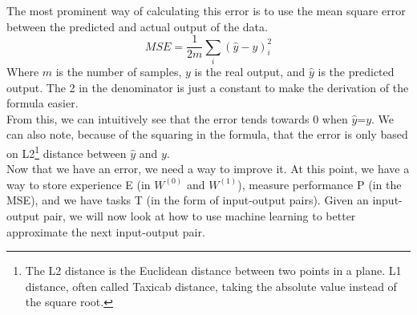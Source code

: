 \noindent The most prominent way of calculating this error is to use the mean square error between the predicted and actual output of the data. 
\begin{equation}\label{eq:MSE_form}
     MSE=\frac{1}{2m} \sum_i (\hat{y}-y)_i^2
\end{equation}
Where $m$ is the number of samples, $y$ is the real output, and $\hat{y}$ is the predicted output. The 2 in the denominator is just a constant to make the derivation of the formula easier.\\
From this, we can intuitively see that the error tends towards 0 when $\hat{y}$=$y$. We can also note, because of the squaring in the formula, that the error is only based on L2\footnote{The L2 distance is the Euclidean distance between two points in a plane. L1 distance, often called Taxicab distance, taking the absolute value instead of the square root.} distance between $\hat{y}$ and $y$.\\
Now that we have an error, we need a way to improve it.
At this point, we have a way to store experience E (in  $W^{(0)}$ and $W^{(1)}$), measure performance P (in the MSE), and we have tasks T (in the form of input-output pairs).
Given an input-output pair, we will now look at how to use machine learning to better approximate the next input-output pair.

